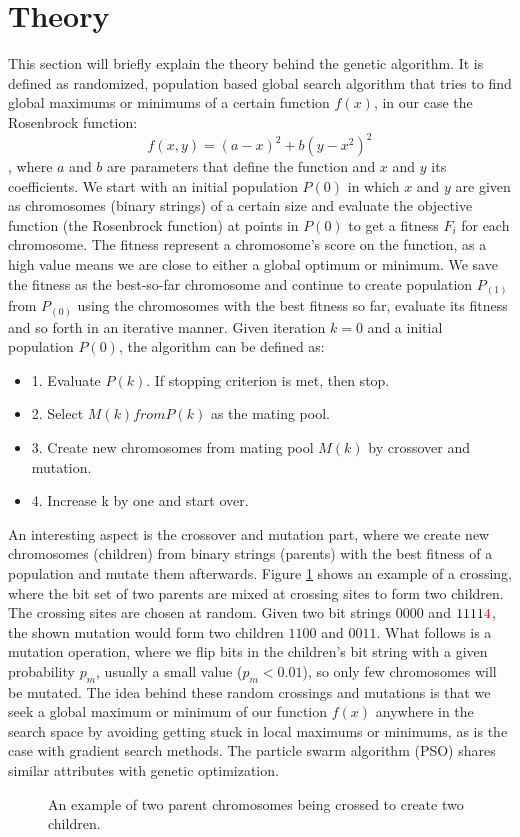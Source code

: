 \section{Theory}\label{sec:theory}

This section will briefly explain the theory behind the genetic algorithm. It is defined as randomized, population based global search algorithm that tries to find global maximums or minimums of a certain function $f(x)$, in our case the Rosenbrock function: $$f(x,y) = (a-x)^2+b(y-x^2)^2$$, where $a$ and $b$ are parameters that define the function and $x$ and $y$ its coefficients. We start with an initial population $P(0)$ in which $x$ and $y$ are given as chromosomes (binary strings) of a certain size and evaluate the objective function (the Rosenbrock function\cite{Shang2006}) at points in $P(0)$ to get a fitness $F_{i}$ for each chromosome. The fitness represent a chromosome's score on the function, as a high value means we are close to either a global optimum or minimum. We save the fitness as the best-so-far chromosome and continue to create population $P_(1)$ from $P_(0)$ using the chromosomes with the best fitness so far, evaluate its fitness and so forth in an iterative manner. Given iteration $k=0$ and a initial population $P(0)$, the algorithm can be defined as\cite{Chong2013}:

\begin{itemize}
	\item 1. Evaluate $P(k)$. If stopping criterion is met, then stop.
	\item 2. Select $M(k) from P(k)$ as the mating pool.
	\item 3. Create new chromosomes from mating pool $M(k)$ by crossover and mutation.
	\item 4. Increase k by one and start over.
\end{itemize}

An interesting aspect is the crossover and mutation part, where we create new chromosomes (children) from binary strings (parents) with the best fitness of a population and mutate them afterwards. Figure \ref{fig:geneticalgocrossover} shows an example of a crossing, where the bit set of two parents are mixed at crossing sites to form two children. The crossing sites are chosen at random. Given two bit strings $0000$ and $1111{\color{red}4}$, the shown mutation would form two children $1100$ and $0011$. What follows is a mutation operation, where we flip bits in the children's bit string with a given probability $p_{m}$, usually a small value ($p_{m} < 0.01$), so only few chromosomes will be mutated. The idea behind these random crossings and mutations is that we seek a global maximum or minimum of our function $f(x)$ anywhere in the search space by avoiding getting stuck in local maximums or minimums, as is the case with gradient search methods. The particle swarm algorithm (PSO) shares similar attributes with genetic optimization.

\begin{figure}[h]
	\centering
	\caption{An example of two parent chromosomes being crossed to create two children.}
	\label{fig:geneticalgocrossover}
\end{figure}



